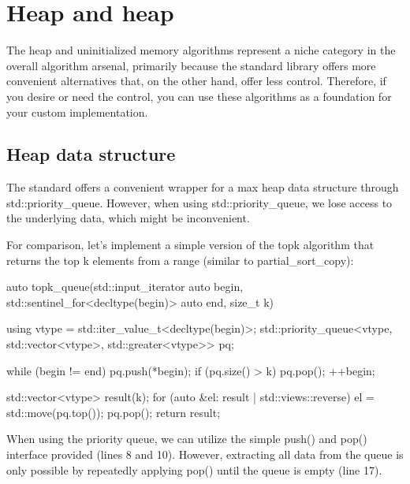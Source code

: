 \section{Heap and heap}

The heap and uninitialized memory algorithms represent a niche category in the overall algorithm arsenal, primarily because the standard library offers more convenient alternatives that, on the other hand, offer less control. Therefore, if you desire or need the control, you can use these algorithms as a foundation for your custom implementation.

\subsection{Heap data structure}

The standard offers a convenient wrapper for a max heap data structure through std::priority\_queue. However, when using std::priority\_queue, we lose access to the underlying data, which might be inconvenient.




For comparison, let’s implement a simple version of the topk algorithm that returns the top k elements from a range (similar to partial\_sort\_copy):

\begin{box-note}
\begin{cppcode}
auto topk_queue(std::input_iterator auto begin, std::sentinel_for<decltype(begin)> auto end, 
                size_t k) {

    using vtype = std::iter_value_t<decltype(begin)>;
    std::priority_queue<vtype, std::vector<vtype>, std::greater<vtype>> pq;

    while (begin != end) {
        pq.push(*begin);
        if (pq.size() > k)
            pq.pop();
        ++begin;
    }

    std::vector<vtype> result(k);
    for (auto &el: result | std::views::reverse) {
        el = std::move(pq.top());
        pq.pop();
    }
    return result;    
}
\end{cppcode}
\end{box-note}

When using the priority queue, we can utilize the simple push() and pop() interface provided (lines 8 and 10). However, extracting all data from the queue is only possible by repeatedly applying pop() until the queue is empty (line 17).

